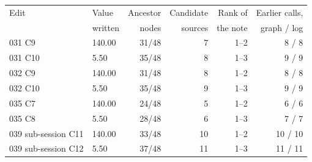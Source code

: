 \begin{tabular}{@{}llrrrr@{}}
\toprule
Edit & Value & Ancestor & Candidate & Rank of & Earlier calls, \\
 & written & nodes & sources & the note & graph / log \\
\midrule
031 C9 & 140.00 & 31/48 & 7 & 1--2 & 8 / 8 \\
031 C10 & 5.50 & 35/48 & 8 & 1--3 & 9 / 9 \\
032 C9 & 140.00 & 31/48 & 8 & 1--2 & 8 / 8 \\
032 C10 & 5.50 & 35/48 & 9 & 1--3 & 9 / 9 \\
035 C7 & 140.00 & 24/48 & 5 & 1--2 & 6 / 6 \\
035 C8 & 5.50 & 28/48 & 6 & 1--3 & 7 / 7 \\
039 sub-session C11 & 140.00 & 33/48 & 10 & 1--2 & 10 / 10 \\
039 sub-session C12 & 5.50 & 37/48 & 11 & 1--3 & 11 / 11 \\
\bottomrule
\end{tabular}
